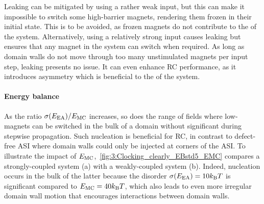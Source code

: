 Leaking can be mitigated by using a rather weak input, but this can make it impossible to switch some high-barrier magnets, rendering them frozen in their initial state.
This is to be avoided, as frozen magnets do not contribute to the  of the system.
Alternatively, using a relatively strong input causes leaking but ensures that any magnet in the system can switch when required.
As long as domain walls do not move through too many unstimulated magnets per input step, leaking presents no issue.
It can even enhance RC performance, as it introduces asymmetry which is beneficial to the  of the system.

\paragraph{Energy balance}
As the ratio $\sigma(E_\mathrm{EA}) / E_\mathrm{MC}$ increases, so does the range of fields where low- magnets can be switched in the bulk of a domain without significant  during stepwise  propagation.
Such nucleation is beneficial for RC, in contrast to defect-free ASI where domain walls could only be injected at corners of the ASI.
To illustrate the impact of $E_\mathrm{MC}$,~\cref{fig:3:Clocking_clearly_EBstd5_EMC} compares a strongly-coupled system (a) with a weakly-coupled system (b). %
Indeed, nucleation occurs in the bulk of the latter because the disorder $\sigma(\EEA) = 10 \kBT$ is significant compared to $\EMC = 40 \kBT$, which also leads to even more irregular domain wall motion that encourages interactions between domain walls.

